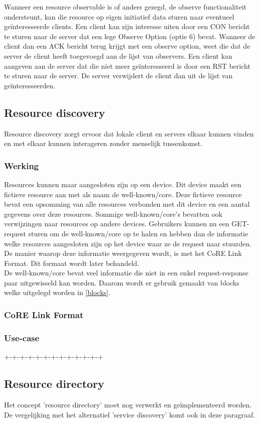 Wanneer een resource observable is of anders gezegd, de observe functionaliteit ondersteunt, kan die resource op eigen initiatief data sturen naar eventueel ge\"{i}nteresseerde clients. Een client kan zijn interesse uiten door een CON bericht te sturen naar de server dat een lege Observe Option (optie 6) bevat. Wanneer de client dan een ACK bericht terug krijgt met een observe option, weet die dat de server de client heeft toegevoegd aan de lijst van observers. Een client kan aangeven aan de server dat die niet meer ge\"{i}nteresseerd is door een RST bericht te sturen naar de server. De server verwijdert de client dan uit de lijst van ge\"{i}nteresseerden.

\subsection{Resource discovery} \label{resourceDiscovery}
Resource discovery zorgt ervoor dat lokale client en servers elkaar kunnen vinden en met elkaar kunnen interageren zonder menselijk tussenkomst.

\subsubsection{Werking}
Resources kunnen maar aangesloten zijn op een device. Dit device maakt een fictieve resource aan met als naam de well-known/core. Deze fictieve resource bevat een opsomming van alle resources verbonden met dit device en een aantal gegevens over deze resources. Sommige well-known/core's bevatten ook verwijzingen naar resources op andere devices. Gebruikers kunnen nu een GET-request sturen om de well-known/core op te halen en hebben dan de informatie welke resources aangesloten zijn op het device waar ze de request naar stuurden. De manier waarop deze informatie weergegeven wordt, is met het CoRE Link Format. Dit formaat wordt later behandeld.\\

\noindent
De well-known/core bevat veel informatie die niet in een enkel request-response paar uitgewisseld kan worden. Daarom wordt er gebruik gemaakt van blocks welke uitgelegd worden in \ref{blocks}.

\subsubsection{CoRE Link Format}


\subsubsection{Use-case}
+-+-+-+-+-+-+-+-+-+-+-+-+

\subsection{Resource directory} %

Het concept 'resource directory' moet nog verwerkt en ge\"{i}mplementeerd worden. De vergelijking met het alternatief 'service discovery' komt ook in deze paragraaf.
